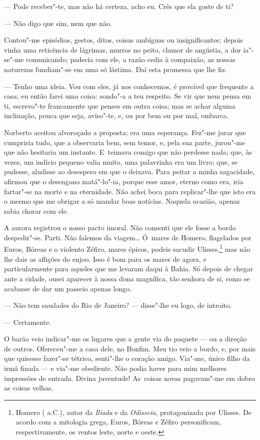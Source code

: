 \begin{linenumbers}
--- Pode receber"-te, mas não há certeza, acho eu. Crês que ela goste de
ti?

--- Não digo que sim, nem que não.

Contou"-me episódios, gestos, ditos, coisas ambíguas ou insignificantes;
depois vinha uma reticência de lágrimas, murros no peito, clamor de
angústia, a dor ia"-se"-me comunicando; padecia com ele, a razão cedia à
compaixão, as nossas naturezas fundiam"-se em uma só lástima. Daí esta
promessa que lhe fiz.

--- Tenho uma ideia. Vou com eles, já nos conhecemos, é provável que
frequente a casa; eu então farei uma coisa: sondo"-a a teu respeito. Se
vir que nem pensa em ti, escrevo"-te francamente que penses em outra
coisa; mas se achar alguma inclinação, pouca que seja, aviso"-te, e, ou
por bem ou por mal, embarca.

Norberto aceitou alvoroçado a proposta; era uma esperança. Fez"-me jurar
que cumpriria tudo, que a observaria bem, sem temor, e, pela sua parte,
jurou"-me que não hesitaria um instante. E~teimava comigo que não
perdesse nada; que, às vezes, um indício pequeno valia muito, uma
palavrinha era um livro; que, se pudesse, aludisse ao desespero em que o
deixava. Para peitar a minha sagacidade, afirmou que o desengano
matá"-lo"-ia, porque esse amor, eterno como era, iria fartar"-se na morte e
na eternidade. Não achei boca para replicar"-lhe que isto era o mesmo que
me obrigar a só mandar boas notícias. Naquela ocasião, apenas sabia
chorar com ele.

A aurora registrou o nosso pacto imoral. Não consenti que ele fosse a
bordo despedir"-se. Parti. Não falemos da viagem\ldots{} Ó~mares de Homero,
flagelados por Euros, Bóreas e o violento Zéfiro, mares épicos, podeis
sacudir Ulisses,\footnote{Homero ( a.C.), autor da \emph{Ilíada} e da
  \emph{Odisseia}, protagonizada por Ulisses. De acordo com a mitologia
  grega, Euros, Bóreas e Zéfiro personificam, respectivamente, os ventos
  leste, norte e oeste.} mas não lhe dais as aflições do enjoo. Isso é
bom para os mares de agora, e particularmente para aqueles que me
levaram daqui à Bahia. Só depois de chegar ante a cidade, ousei aparecer
à nossa dona magnífica, tão senhora de si, como se acabasse de dar um
passeio apenas longo.

--- Não tem saudades do Rio de Janeiro? --- disse"-lhe eu logo, de
introito.

--- Certamente.

O barão veio indicar"-me os lugares que a gente via do paquete --- ou a
direção de outros. Ofereceu"-me a casa dele, no Bonfim. Meu tio veio a
bordo, e, por mais que quisesse fazer"-se tétrico, senti"-lhe o coração
amigo. Via"-me, único filho da irmã finada --- e via"-me obediente. Não
podia haver para mim melhores impressões de entrada. Divina juventude!
As~coisas novas pagavam"-me em dobro as coisas velhas.


\end{linenumbers}
